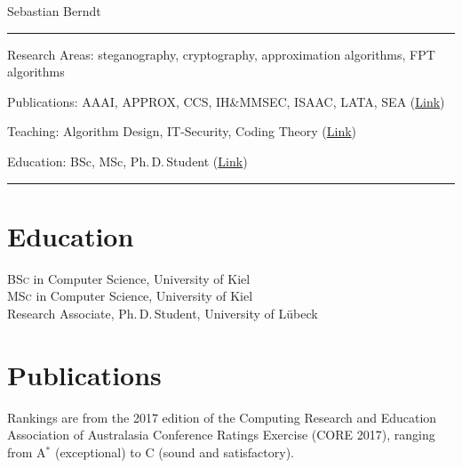\documentclass[10pt, a4paper]{article}
\newcommand{\years}[1]{\marginnote{\scriptsize #1}}
\begin{document}
{\LARGE Sebastian Berndt}\\[2mm]
\hrule
\vspace{2mm}
{\large Research Areas:}
steganography, cryptography, approximation algorithms, \textsc{FPT}
algorithms

{\large Publications:} AAAI, APPROX, CCS, IH{\&}MMSEC, ISAAC, LATA, SEA
(\hyperref[publications]{Link})

{\large Teaching:} Algorithm Design, IT-Security, Coding Theory
(\hyperref[teaching]{Link})

{\large Education:} BSc, MSc, Ph.\,D.\,Student
(\hyperref[education]{Link})\\[-1mm]
\hrule
\vfill








\section*{Education}
\label{education}
\years{2010}\textsc{BSc} in Computer Science, University of Kiel\\
\years{2012}\textsc{MSc} in Computer Science, University of Kiel\\
\years{2012--}Research Associate, Ph.\,D.\,Student, University of Lübeck


\section*{Publications}
\label{publications}
 Rankings are from the 2017 edition of the Computing Research
and Education Association of Australasia Conference Ratings Exercise (CORE 2017),
ranging from A$^{*}$ (exceptional) to C (sound and satisfactory).\\[.2cm]
\end{document}
